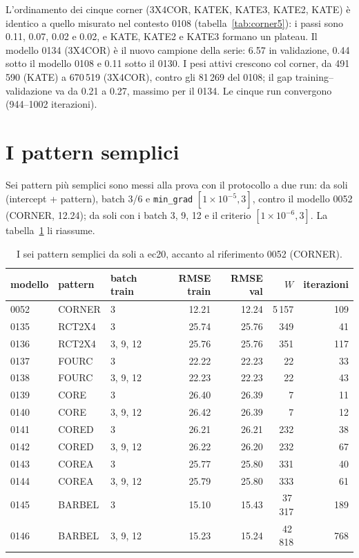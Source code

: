 L'ordinamento dei cinque corner (3X4COR, KATEK, KATE3, KATE2,
KATE) è identico a quello misurato nel contesto 0108
(tabella~\ref{tab:corner5}): i passi sono 0.11, 0.07, 0.02 e
0.02, e KATE, KATE2 e KATE3 formano un plateau. Il modello
0134 (3X4COR) è il nuovo campione della serie: 6.57 in
validazione, 0.44 sotto il modello 0108 e 0.11 sotto il 0130.
I pesi attivi crescono col corner, da 491\,590 (KATE) a
670\,519 (3X4COR), contro gli 81\,269 del 0108; il gap
training--validazione va da 0.21 a 0.27, massimo per il 0134.
Le cinque run convergono (944--1002 iterazioni).

\section{I pattern semplici}

Sei pattern più semplici sono messi alla prova con il protocollo
a due run: da soli (intercept + pattern), batch 3/6 e \texttt{min\_grad}
$[1\times10^{-5}, 3]$, contro il modello 0052 (CORNER, 12.24); da
soli con i batch 3, 9, 12 e il criterio $[1\times10^{-6}, 3]$. La
tabella~\ref{tab:semplici} li riassume.

\begin{table}[ht]
\centering
\small
\begin{tabular}{lllrrrr}
\toprule
modello & pattern & batch train & RMSE train & RMSE val & $W$ & iterazioni \\
\midrule
0052 & CORNER & 3 & 12.21 & 12.24 & 5\,157 & 109 \\
0135 & RCT2X4 & 3 & 25.74 & 25.76 & 349 & 41 \\
0136 & RCT2X4 & 3, 9, 12 & 25.76 & 25.76 & 351 & 117 \\
0137 & FOURC & 3 & 22.22 & 22.23 & 22 & 33 \\
0138 & FOURC & 3, 9, 12 & 22.23 & 22.23 & 22 & 43 \\
0139 & CORE & 3 & 26.40 & 26.39 & 7 & 11 \\
0140 & CORE & 3, 9, 12 & 26.42 & 26.39 & 7 & 12 \\
0141 & CORED & 3 & 26.21 & 26.21 & 232 & 38 \\
0142 & CORED & 3, 9, 12 & 26.22 & 26.20 & 232 & 67 \\
0143 & COREA & 3 & 25.77 & 25.80 & 331 & 40 \\
0144 & COREA & 3, 9, 12 & 25.79 & 25.80 & 333 & 61 \\
0145 & BARBEL & 3 & 15.10 & 15.43 & 37\,317 & 189 \\
0146 & BARBEL & 3, 9, 12 & 15.23 & 15.24 & 42\,818 & 768 \\
\bottomrule
\end{tabular}
\caption{I sei pattern semplici da soli a ec20, accanto al
riferimento 0052 (CORNER).}
\label{tab:semplici}
\end{table}

